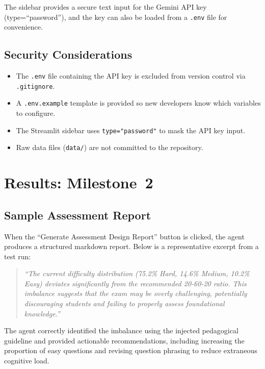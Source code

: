 \documentclass[12pt, a4paper]{article}
\begin{document}
The sidebar provides a secure text input for the Gemini API key (type=``password''), and the key can also be loaded from a \texttt{.env} file for convenience.

\subsection{Security Considerations}

\begin{itemize}[noitemsep]
    \item The \texttt{.env} file containing the API key is excluded from version control via \texttt{.gitignore}.
    \item A \texttt{.env.example} template is provided so new developers know which variables to configure.
    \item The Streamlit sidebar uses \texttt{type="password"} to mask the API key input.
    \item Raw data files (\texttt{data/}) are not committed to the repository.
\end{itemize}

\section{Results: Milestone~2}
\label{sec:results-m2}

\subsection{Sample Assessment Report}

When the ``Generate Assessment Design Report'' button is clicked, the agent produces a structured markdown report. Below is a representative excerpt from a test run:

\begin{quote}
\textit{``The current difficulty distribution (75.2\% Hard, 14.6\% Medium, 10.2\% Easy) deviates significantly from the recommended 20-60-20 ratio. This imbalance suggests that the exam may be overly challenging, potentially discouraging students and failing to properly assess foundational knowledge.''}
\end{quote}

The agent correctly identified the imbalance using the injected pedagogical guideline and provided actionable recommendations, including increasing the proportion of easy questions and revising question phrasing to reduce extraneous cognitive load.
\end{document}
